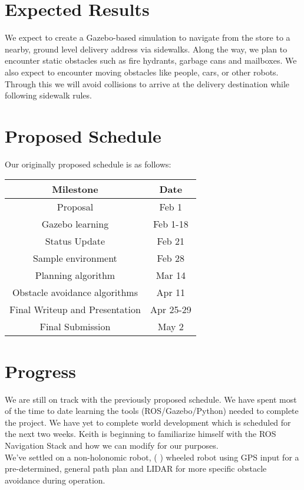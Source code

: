 \documentclass{article}
\begin{document}
\begin{multicols}{2}
\section*{Expected Results}
We expect to create a Gazebo-based simulation to navigate from the store to a nearby, ground level delivery address via sidewalks.  Along the way, we plan to encounter static obstacles such as fire hydrants, garbage cans and mailboxes.  We also expect to encounter moving obstacles like people, cars, or other robots.  Through this we will avoid collisions to arrive at the delivery destination while following sidewalk rules.

\section*{Proposed Schedule}
Our originally proposed schedule is as follows:

\begin{center}
\begin{tabular}{|cc|}
\hline
Milestone & Date  \\
\hline
Proposal  &  Feb 1 \\
Gazebo learning  &  Feb 1-18 \\
Status Update  &  Feb 21 \\
Sample environment & Feb 28\\
Planning algorithm & Mar 14\\
Obstacle avoidance algorithms & Apr 11\\
Final Writeup and Presentation & Apr 25-29\\
Final Submission  &  May 2 \\
\hline
\end{tabular}
\end{center}
\section*{Progress}
We are still on track with the previously proposed schedule.  We have spent most of the time to date learning the tools (ROS/Gazebo/Python) needed to complete the project.  We have yet to complete world development which is scheduled for the next two weeks.  Keith is beginning to familiarize himself with the ROS Navigation Stack and how we can modify for our purposes.\\
We've settled on a non-holonomic robot, (  )  wheeled robot using GPS input for a pre-determined, general path plan and LIDAR for more specific obstacle avoidance during operation.

\end{multicols}
\end{document}
